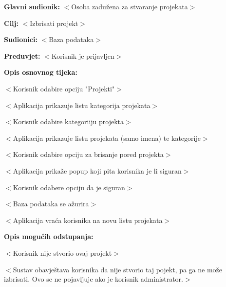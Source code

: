 					\noindent {}
					\begin{packed_item}
					
						\item \textbf{Glavni sudionik: }$<$Osoba zadužena za stvaranje projekata$>$
						\item  \textbf{Cilj:} $<$Izbrisati projekt$>$
						\item  \textbf{Sudionici:} $<$Baza podataka$>$
						\item  \textbf{Preduvjet:} $<$Korisnik je prijavljen$>$
						\item  \textbf{Opis osnovnog tijeka:}
					
						\item[] \begin{packed_enum}

							\item $<$Korisnik odabire opciju "Projekti"$>$
							\item $<$Aplikacija prikazuje listu kategorija projekata$>$
							\item $<$Korisnik odabire kategoriiju projekta$>$
							\item $<$Aplikacija prikazuje listu projekata (samo imena) te kategorije$>$
							\item $<$Korisnik odabire opciju za brisanje pored projekta$>$
							\item $<$Aplikacija prikaže popup koji pita korisnika je li siguran$>$
							\item $<$Korisnik odabere opciju da je siguran$>$
							\item $<$Baza podataka se ažurira$>$
							\item $<$Aplikacija vraća korisnika na novu listu projekata$>$
						\end{packed_enum}
					
						\item  \textbf{Opis mogućih odstupanja:}
					
						\item[] \begin{packed_item}
					
							\item[5.a] $<$Korisnik nije stvorio ovaj projekt$>$
							\item[] \begin{packed_enum}
			
								\item $<$Sustav obavještava korisnika da nije stvorio taj pojekt, pa ga ne može izbrisati.
								Ovo se ne pojavljuje ako je korisnik administrator.$>$
			
							\end{packed_enum}
					
						\end{packed_item}
					\end{packed_item}

